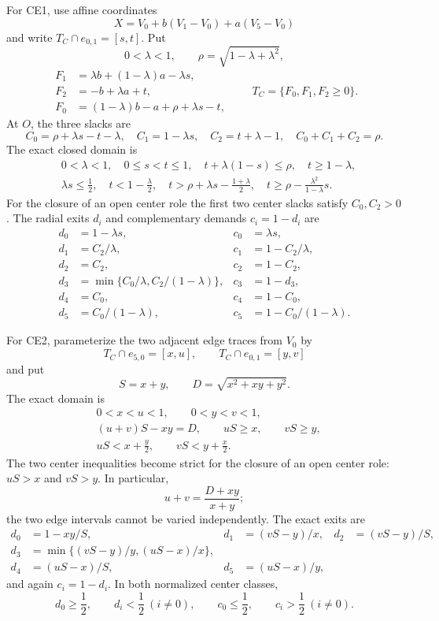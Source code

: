 For CE1, use affine coordinates
\[
 X=V_0+b(V_1-V_0)+a(V_5-V_0)
\]
and write $T_C\cap e_{0,1}=[s,t]$.  Put
\[
 0<\lambda<1,\qquad \rho=\sqrt{1-\lambda+\lambda^2},
\]
\[
 \begin{aligned}
 F_1&=\lambda b+(1-\lambda)a-\lambda s,\\
 F_2&=-b+\lambda a+t,\\
 F_0&=(1-\lambda)b-a+\rho+\lambda s-t,
 \end{aligned}
\qquad
 T_C=\{F_0,F_1,F_2\ge0\}.
\]
At $O$, the three slacks are
\[
 C_0=\rho+\lambda s-t-\lambda,\quad
 C_1=1-\lambda s,\quad
 C_2=t+\lambda-1,\quad
 C_0+C_1+C_2=\rho.
\]
The exact closed domain is
\begin{align*}
 &0<\lambda<1,\quad0\le s<t\le1,\quad
 t+\lambda(1-s)\le\rho,\quad t\ge1-\lambda,\\
 &\lambda s\le\tfrac12,\quad t<1-\tfrac\lambda2,\quad
 t>\rho+\lambda s-\tfrac{1+\lambda}{2},\quad
 t\ge\rho-\frac{\lambda^2}{1-\lambda}s.
\end{align*}
For the closure of an open center role the first two center slacks satisfy
$C_0,C_2>0$.  The radial exits $d_i$ and complementary demands $c_i=1-d_i$
are
\begin{equation}
 \begin{aligned}
 d_0&=1-\lambda s,&c_0&=\lambda s,\\
 d_1&=C_2/\lambda,&c_1&=1-C_2/\lambda,\\
 d_2&=C_2,&c_2&=1-C_2,\\
 d_3&=\min\{C_0/\lambda,C_2/(1-\lambda)\},
 &c_3&=1-d_3,\\
 d_4&=C_0,&c_4&=1-C_0,\\
 d_5&=C_0/(1-\lambda),&c_5&=1-C_0/(1-\lambda).
 \end{aligned}
 \label{eq:CE1-exits}
\end{equation}

For CE2, parameterize the two adjacent edge traces from $V_0$ by
\[
 T_C\cap e_{5,0}=[x,u],\qquad T_C\cap e_{0,1}=[y,v]
\]
and put
\[
 S=x+y,\qquad D=\sqrt{x^2+xy+y^2}.
\]
The exact domain is
\begin{align*}
 &0<x<u<1,\qquad0<y<v<1,\\
 &(u+v)S-xy=D,\qquad uS\ge x,\qquad vS\ge y,\\
 &uS<x+\tfrac y2,\qquad vS<y+\tfrac x2.
\end{align*}
The two center inequalities become strict for the closure of an open center
role: $uS>x$ and $vS>y$.  In particular,
\begin{equation}
 u+v=\frac{D+xy}{x+y};
 \label{eq:CE2-coupling}
\end{equation}
the two edge intervals cannot be varied independently.  The exact exits are
\begin{equation}
 \begin{aligned}
 d_0&=1-xy/S,&d_1&=(vS-y)/x,&d_2&=(vS-y)/S,\\
 d_3&=\min\{(vS-y)/y,(uS-x)/x\},\\
 d_4&=(uS-x)/S,&d_5&=(uS-x)/y,
 \end{aligned}
 \label{eq:CE2-exits}
\end{equation}
and again $c_i=1-d_i$.  In both normalized center classes,
\[
 d_0\ge\frac12,\qquad d_i<\frac12\ (i\ne0),
 \qquad
 c_0\le\frac12,\qquad c_i>\frac12\ (i\ne0).
\]
